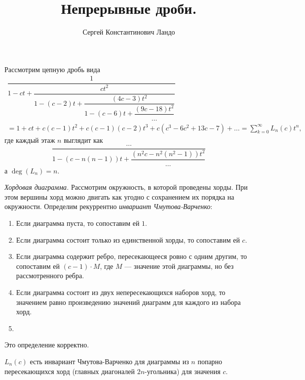 \documentclass[12pt,a4paper]{article}
\title{Непрерывные дроби.}
\author{Сергей Константинович Ландо}
\begin{document}
    \maketitle

    Рассмотрим цепную дробь вида
    \begin{gather*}
        \dfrac{1}{
            1 - ct + \dfrac{ct^2}{
                1 - (c-2)t + \dfrac{(4c-3)t^2}{
                    1 - (c-6)t + \dfrac{(9c-18)t^2}{
                        \dots
                    }
                }
            }
        }\\
        = 1 + ct + c(c-1)t^2 + c(c-1)(c-2)t^3 + c(c^3 - 6c^2 + 13c - 7) + \dots = \sum_{k=0}^\infty L_n(c) t^n,
    \end{gather*}
    где каждый этаж $n$ выглядит как
    \[
        \dfrac{\dots}{
            1 - (c - n(n-1))t + \dfrac{(n^2 c - n^2(n^2 - 1))t^2}{
                \dots
            }
        }
    \]
    а $\deg(L_n) = n$.

    \begin{definition}
        \emph{Хордовая диаграмма.} Рассмотрим  окружность, в которой проведены хорды. При этом вершины хорд можно двигать как угодно с сохранением их порядка на окружности. Определим рекуррентно \emph{инвариант Чмутова-Варченко}:
        \begin{enumerate}
            \item Если диаграмма пуста, то сопоставим ей $1$.
            \item Если диаграмма состоит только из единственной хорды, то сопоставим ей $c$.
            \item Если диаграмма содержит ребро, пересекающееся ровно с одним другим, то сопоставим ей $(c-1) \cdot M$, где $M$ --- значение этой диаграммы, но без рассмотренного ребра.
            \item Если диаграмма состоит из двух непересекающихся наборов хорд, то значением равно произведению значений диаграмм для каждого из набора хорд.
            \item {}
        \end{enumerate}
    \end{definition}

    \begin{theorem}
        Это определение корректно.
    \end{theorem}

    \begin{statement}
        $L_n(c)$ есть инвариант Чмутова-Варченко для диаграммы из $n$ попарно пересекающихся хорд (главных диагоналей $2n$-угольника) для значения $c$.
    \end{statement}
\end{document}
